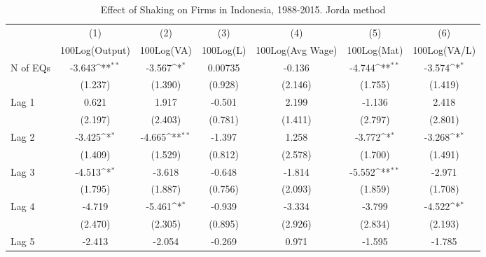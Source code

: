 \begin{table}[htbp]\centering
\def\sym#1{\ifmmode^{#1}\else\(^{#1}\)\fi}
\caption{Effect of Shaking on Firms in Indonesia, 1988-2015. Jorda method}
\begin{tabular}{l*{6}{c}}
\toprule
                &\multicolumn{1}{c}{(1)}&\multicolumn{1}{c}{(2)}&\multicolumn{1}{c}{(3)}&\multicolumn{1}{c}{(4)}&\multicolumn{1}{c}{(5)}&\multicolumn{1}{c}{(6)}\\
                &\multicolumn{1}{c}{100Log(Output)}&\multicolumn{1}{c}{100Log(VA)}&\multicolumn{1}{c}{100Log(L)}&\multicolumn{1}{c}{100Log(Avg Wage)}&\multicolumn{1}{c}{100Log(Mat)}&\multicolumn{1}{c}{100Log(VA/L)}\\
\midrule
N of EQs        &   -3.643\sym{**} &   -3.567\sym{*}  &  0.00735         &   -0.136         &   -4.744\sym{**} &   -3.574\sym{*}  \\
                &  (1.237)         &  (1.390)         &  (0.928)         &  (2.146)         &  (1.755)         &  (1.419)         \\
\addlinespace
Lag 1           &    0.621         &    1.917         &   -0.501         &    2.199         &   -1.136         &    2.418         \\
                &  (2.197)         &  (2.403)         &  (0.781)         &  (1.411)         &  (2.797)         &  (2.801)         \\
\addlinespace
Lag 2           &   -3.425\sym{*}  &   -4.665\sym{**} &   -1.397         &    1.258         &   -3.772\sym{*}  &   -3.268\sym{*}  \\
                &  (1.409)         &  (1.529)         &  (0.812)         &  (2.578)         &  (1.700)         &  (1.491)         \\
\addlinespace
Lag 3           &   -4.513\sym{*}  &   -3.618         &   -0.648         &   -1.814         &   -5.552\sym{**} &   -2.971         \\
                &  (1.795)         &  (1.887)         &  (0.756)         &  (2.093)         &  (1.859)         &  (1.708)         \\
\addlinespace
Lag 4           &   -4.719         &   -5.461\sym{*}  &   -0.939         &   -3.334         &   -3.799         &   -4.522\sym{*}  \\
                &  (2.470)         &  (2.305)         &  (0.895)         &  (2.926)         &  (2.834)         &  (2.193)         \\
\addlinespace
Lag 5           &   -2.413         &   -2.054         &   -0.269         &    0.971         &   -1.595         &   -1.785         \\

\end{tabular}
\end{table}
